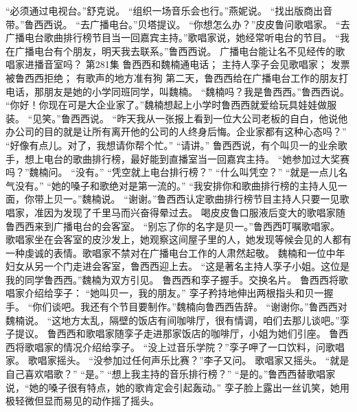 \documentclass[a4paper,12pt,UTF8,twoside]{ctexbook}
\begin{document}
        “必须通过电视台。”舒克说。  
        “组织一场音乐会也行。”燕妮说。  
        “找出版商出音带。”鲁西西说。  
        “去广播电台。”贝塔提议。  
        “你想怎么办？”皮皮鲁问歌唱家。  
        “去广播电台歌曲排行榜节目当一回嘉宾主持。”歌唱家说，她经常听电台的节目。  
        “我在广播电台有个朋友，明天我去联系。”鲁西西说。  
        广播电台能让名不见经传的歌唱家进播音室吗？          第281集  
        鲁西西和魏楠通电话；  
        主持人孪子会见歌唱家；  
        发票被鲁西西拒绝；  
        有歌声的地方准有狗    
        第二天，鲁西西给在广播电台工作的朋友打电话，那朋友是她的小学同班同学，叫魏楠。  
        “魏楠吗？我是鲁西西。”鲁西西说。  
        “你好！你现在可是大企业家了。”魏楠想起上小学时鲁西西就爱给玩具娃娃做服装。  
        “见笑。”鲁西西说。  
        “昨天我从一张报上看到一位大公司老板的自白，他说他办公司的目的就是让所有离开他的公司的人终身后悔。企业家都有这种心态吗？”  
        “好像有点儿。对了，我想请你帮个忙。”  
        “请讲。”        
        鲁西西说，有个叫贝一的业余歌手，想上电台的歌曲排行榜，最好能到直播室当一回嘉宾主持。  
        “她参加过大奖赛吗？”魏楠问。  
        “没有。”  
        “凭空就上电台排行榜？”  
        “什么叫凭空？”  
        “就是一点儿名气没有。”  
        “她的嗓子和歌绝对是第一流的。”  
        “我安排你和歌曲排行榜的主持人见一面，你带上贝一。”魏楠说。  
        “谢谢。”鲁西西认定歌曲排行榜节目主持人只要一见歌唱家，准因为发现了千里马而兴奋得晕过去。  
        喝皮皮鲁口服液后变大的歌唱家随鲁西西来到广播电台的会客室。  
        “别忘了你的名字是贝一。”鲁西西叮嘱歌唱家。  
        歌唱家坐在会客室的皮沙发上，她观察这间屋子里的人，她发现等候会见的人都有一种虔诚的表情。歌唱家不禁对在广播电台工作的人肃然起敬。  
        魏楠和一位中年妇女从另一个门走进会客室，鲁西西迎上去。  
        “这是著名主持人孪子小姐。这位是我的同学鲁西西。”魏楠为双方引见。  
        鲁西西和孪子握手。交换名片。        
        鲁西西将歌唱家介绍给孪子：  
        “她叫贝一，我的朋友。”  
        孪子矜持地伸出两根指头和贝一握手。  
        “你们谈吧。我还有个节目要制作。”魏楠向鲁西西告辞。  
        “谢谢你。”鲁西西对魏楠说。  
        “这地方太乱，隔壁的饭店有间咖啡厅，很有情调，咱们去那儿谈吧。”孪子提议。  
        鲁西西和歌唱家随孪子走进那家饭店的咖啡厅，小姐为她们引座。  
        鲁西西将歌唱家的情况介绍给孪子。  
        “没上过音乐学院？”孪子呷了一口饮料，问歌唱家。  
        歌唱家摇头。  
        “没参加过任何声乐比赛？”李子又问。  
        歌唱家又摇头。  
        “就是自己喜欢唱歌？”  
        “是。”  
        “想上我主持的音乐排行榜？”  
        “是的。”鲁西西替歌唱家说，“她的嗓子很有特点，她的歌肯定会引起轰动。”  
        孪子脸上露出一丝讥笑，她用极轻微但显而易见的动作摇了摇头。  
\end{document}
